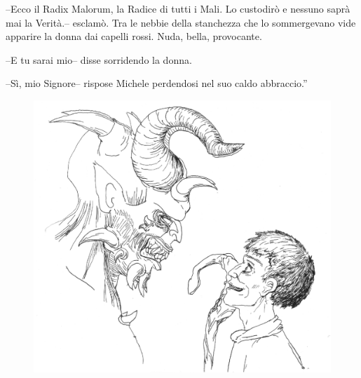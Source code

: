 \begin{racconto}
  --Ecco il Radix Malorum, la Radice di tutti i Mali. Lo custodir\`o
  e nessuno sapr\`a mai la Verit\`a.-- esclam\`o. Tra le nebbie
  della stanchezza che lo sommergevano vide apparire la donna dai
  capelli rossi. Nuda, bella, provocante.
  
  --E tu sarai mio-- disse sorridendo la donna.
  
  --S\`i, mio Signore-- rispose Michele perdendosi nel suo caldo
  abbraccio.''
\begin{figure}[t]
\begin{center}
\includegraphics{michele_arioch.eps}
\end{center}
\end{figure}

\end{racconto}

\twocolumn


